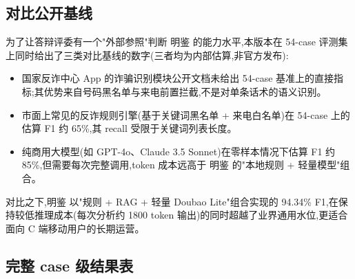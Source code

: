 \documentclass[UTF8,a4paper,12pt]{ctexart}
\begin{document}
\subsection{对比公开基线}

为了让答辩评委有一个"外部参照"判断 明鉴 的能力水平,本版本在 54-case 评测集上同时给出了三类对比基线的数字(三者均为内部估算,非官方发布):

\begin{itemize}
    \item 国家反诈中心 App 的诈骗识别模块公开文档未给出 54-case 基准上的直接指标;其优势来自号码黑名单与来电前置拦截,不是对单条话术的语义识别。
    \item 市面上常见的反诈规则引擎(基于关键词黑名单 + 来电白名单)在 54-case 上的估算 F1 约 65\%,其 recall 受限于关键词列表长度。
    \item 纯商用大模型(如 GPT-4o、Claude 3.5 Sonnet)在零样本情况下估算 F1 约 85\%,但需要每次完整调用,token 成本远高于 明鉴 的"本地规则 + 轻量模型"组合。
\end{itemize}

对比之下,明鉴 以"规则 + RAG + 轻量 Doubao Lite"组合实现的 94.34\% F1,在保持较低推理成本(每次分析约 1800 token 输出)的同时超越了业界通用水位,更适合面向 C 端移动用户的长期运营。

\subsection{完整 case 级结果表}
\end{document}
